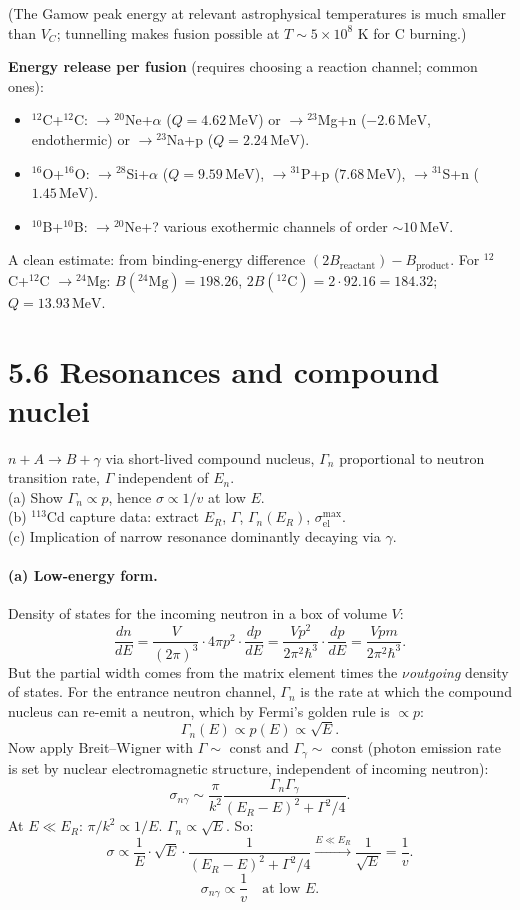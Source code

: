 \documentclass[11pt]{article}
\newcommand{\Q}[1]{\begin{question}#1\end{question}}
\newcommand{\MeV}{\,\mathrm{MeV}}
\begin{document}
(The Gamow peak energy at relevant astrophysical temperatures is much smaller than $V_C$; tunnelling makes fusion possible at $T\sim 5\times 10^{8}$ K for C burning.)

\textbf{Energy release per fusion} (requires choosing a reaction channel; common ones):
\begin{itemize}[itemsep=1pt]
\item $^{12}$C+$^{12}$C: $\to{}^{20}$Ne+$\alpha$ ($Q=4.62\MeV$) or $\to{}^{23}$Mg+n ($-2.6\MeV$, endothermic) or $\to{}^{23}$Na+p ($Q=2.24\MeV$).
\item $^{16}$O+$^{16}$O: $\to{}^{28}$Si+$\alpha$ ($Q=9.59\MeV$), $\to{}^{31}$P+p ($7.68\MeV$), $\to{}^{31}$S+n ($1.45\MeV$).
\item $^{10}$B+$^{10}$B: $\to{}^{20}$Ne+? various exothermic channels of order $\sim 10\MeV$.
\end{itemize}
A clean estimate: from binding-energy difference $(2 B_\mathrm{reactant})-B_\mathrm{product}$. For $^{12}$C+$^{12}$C $\to{}^{24}$Mg: $B(^{24}\mathrm{Mg})=198.26$, $2 B(^{12}\mathrm{C})=2\cdot 92.16=184.32$; $Q=13.93\MeV$.

\section*{5.6 \quad Resonances and compound nuclei}

\Q{$n+A\to B+\gamma$ via short-lived compound nucleus, $\Gamma_n$ proportional to neutron transition rate, $\Gamma$ independent of $E_n$.\\
(a) Show $\Gamma_n\propto p$, hence $\sigma\propto 1/v$ at low $E$.\\
(b) $^{113}$Cd capture data: extract $E_R$, $\Gamma$, $\Gamma_n(E_R)$, $\sigma_\mathrm{el}^\mathrm{max}$.\\
(c) Implication of narrow resonance dominantly decaying via $\gamma$.}

\paragraph{(a) Low-energy form.}
Density of states for the incoming neutron in a box of volume $V$:
\[
\frac{dn}{dE}=\frac{V}{(2\pi)^{3}}\cdot 4\pi p^{2}\cdot\frac{dp}{dE}=\frac{V p^{2}}{2\pi^{2}\hbar^{3}}\cdot\frac{dp}{dE}=\frac{V p m}{2\pi^{2}\hbar^{3}}.
\]
But the partial width comes from the matrix element times the $\nu$\textit{outgoing} density of states. For the entrance neutron channel, $\Gamma_n$ is the rate at which the compound nucleus can re-emit a neutron, which by Fermi's golden rule is $\propto p$:
\[
\Gamma_n(E)\propto p(E)\propto\sqrt E.
\]
Now apply Breit--Wigner with $\Gamma\sim$ const and $\Gamma_\gamma\sim$ const (photon emission rate is set by nuclear electromagnetic structure, independent of incoming neutron):
\[
\sigma_{n\gamma}\sim\frac{\pi}{k^{2}}\frac{\Gamma_n\Gamma_\gamma}{(E_R-E)^{2}+\Gamma^{2}/4}.
\]
At $E\ll E_R$: $\pi/k^{2}\propto 1/E$. $\Gamma_n\propto\sqrt E$. So:
\[
\sigma\propto\frac{1}{E}\cdot\sqrt E\cdot\frac{1}{(E_R-E)^{2}+\Gamma^{2}/4}\xrightarrow{E\ll E_R}\frac{1}{\sqrt E}=\frac{1}{v}.
\]
\[
\boxed{\;\sigma_{n\gamma}\propto\frac{1}{v}\quad\text{at low }E.\;}
\]
\end{document}
